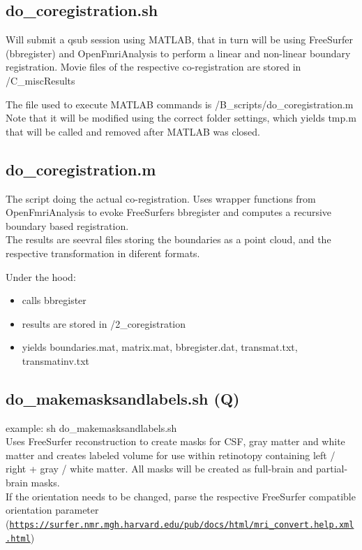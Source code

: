 \documentclass[12pt,a4paper]{scrartcl}
\begin{document}
\subsection{do\_coregistration.sh}
\label{sec:coreg}
Will submit a qsub session using MATLAB, that in turn will be using FreeSurfer (bbregister) and OpenFmriAnalysis to perform a linear and non-linear boundary registration.  Movie files of the respective co-registration are stored in /C\_miscResults

\noindent The file used to execute MATLAB commands is /B\_scripts/do\_coregistration.m Note that it will be modified using the correct folder settings, which yields tmp.m that will be called and removed after MATLAB was closed.\\

\subsection{do\_coregistration.m}
The script doing the actual co-registration. Uses wrapper functions from OpenFmriAnalysis to evoke FreeSurfers bbregister and computes a recursive boundary based registration.\\

\noindent The results are seevral files storing the boundaries as a point cloud, and the respective transformation in diferent formats.

\noindent Under the hood:
\begin{itemize}
\item calls bbregister
\item results are stored in /2\_coregistration
\item yields boundaries.mat, matrix.mat, bbregister.dat, transmat.txt, transmatinv.txt
\end{itemize}

\subsection{do\_makemasksandlabels.sh (Q)}
\label{sec:msklbl}
example: sh do\_makemasksandlabels.sh\\

\noindent Uses FreeSurfer reconstruction to create masks for CSF, gray matter and white matter and creates labeled volume for use within retinotopy containing left / right + gray / white matter. All masks will be created as full-brain and partial-brain masks.\\

\noindent If the orientation needs to be changed, parse the respective FreeSurfer compatible orientation parameter (\href{https://surfer.nmr.mgh.harvard.edu/pub/docs/html/mri_convert.help.xml.html}{\nolinkurl{https://surfer.nmr.mgh.harvard.edu/pub/docs/html/mri\_convert.help.xml.html}})\\
\end{document}

